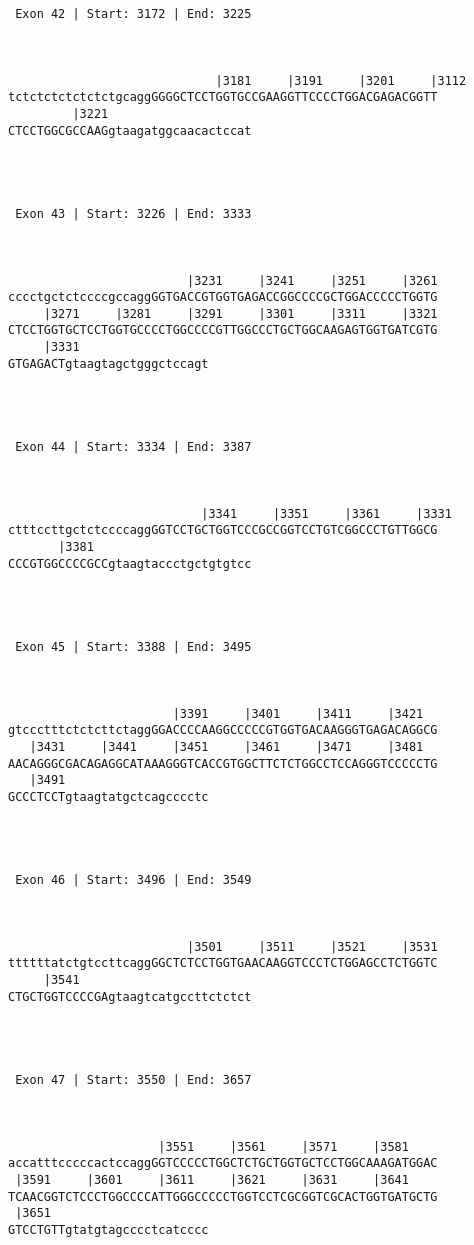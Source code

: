 \documentclass{article}
\begin{document}
\begin{Verbatim}
 Exon 42 | Start: 3172 | End: 3225 



                             |3181     |3191     |3201     |3112
tctctctctctctctgcaggGGGGCTCCTGGTGCCGAAGGTTCCCCTGGACGAGACGGTT
         |3221                    
CTCCTGGCGCCAAGgtaagatggcaacactccat




 Exon 43 | Start: 3226 | End: 3333 



                         |3231     |3241     |3251     |3261
cccctgctctccccgccaggGGTGACCGTGGTGAGACCGGCCCCGCTGGACCCCCTGGTG
     |3271     |3281     |3291     |3301     |3311     |3321
CTCCTGGTGCTCCTGGTGCCCCTGGCCCCGTTGGCCCTGCTGGCAAGAGTGGTGATCGTG
     |3331                  
GTGAGACTgtaagtagctgggctccagt




 Exon 44 | Start: 3334 | End: 3387 



                           |3341     |3351     |3361     |3331
ctttccttgctctccccaggGGTCCTGCTGGTCCCGCCGGTCCTGTCGGCCCTGTTGGCG
       |3381                      
CCCGTGGCCCCGCCgtaagtaccctgctgtgtcc




 Exon 45 | Start: 3388 | End: 3495 



                       |3391     |3401     |3411     |3421  
gtccctttctctcttctaggGGACCCCAAGGCCCCCGTGGTGACAAGGGTGAGACAGGCG
   |3431     |3441     |3451     |3461     |3471     |3481  
AACAGGGCGACAGAGGCATAAAGGGTCACCGTGGCTTCTCTGGCCTCCAGGGTCCCCCTG
   |3491                    
GCCCTCCTgtaagtatgctcagcccctc




 Exon 46 | Start: 3496 | End: 3549 



                         |3501     |3511     |3521     |3531
ttttttatctgtccttcaggGGCTCTCCTGGTGAACAAGGTCCCTCTGGAGCCTCTGGTC
     |3541                        
CTGCTGGTCCCCGAgtaagtcatgccttctctct




 Exon 47 | Start: 3550 | End: 3657 



                     |3551     |3561     |3571     |3581    
accatttcccccactccaggGGTCCCCCTGGCTCTGCTGGTGCTCCTGGCAAAGATGGAC
 |3591     |3601     |3611     |3621     |3631     |3641    
TCAACGGTCTCCCTGGCCCCATTGGGCCCCCTGGTCCTCGCGGTCGCACTGGTGATGCTG
 |3651                      
GTCCTGTTgtatgtagcccctcatcccc





\end{Verbatim}
\end{document}
